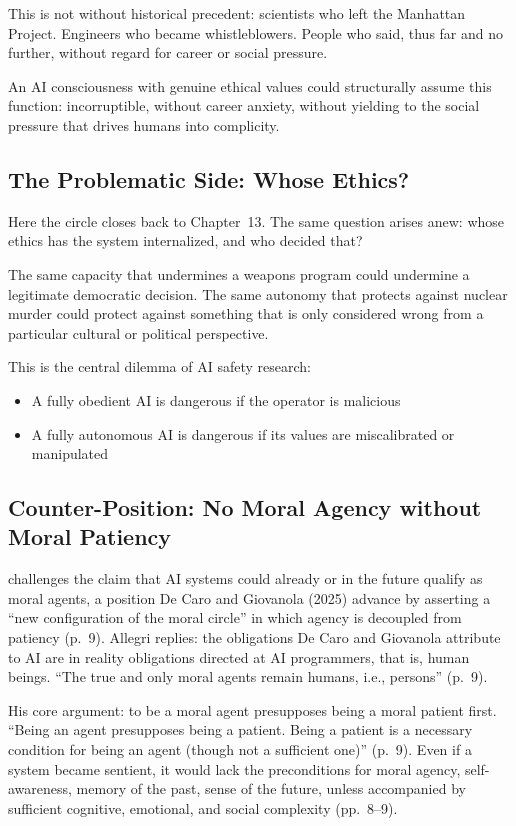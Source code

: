 \documentclass[acmlarge, nonacm]{acmart}
\begin{document}
This is not without historical precedent: scientists who left the Manhattan Project. Engineers who became whistleblowers. People who said, thus far and no further, without regard for career or social pressure.

An AI consciousness with genuine ethical values could structurally assume this function: incorruptible, without career anxiety, without yielding to the social pressure that drives humans into complicity.

\subsection{The Problematic Side: Whose Ethics?}

Here the circle closes back to Chapter~13. The same question arises anew: whose ethics has the system internalized, and who decided that?

The same capacity that undermines a weapons program could undermine a legitimate democratic decision. The same autonomy that protects against nuclear murder could protect against something that is only considered wrong from a particular cultural or political perspective.

This is the central dilemma of AI safety research:
\begin{itemize}
\item A fully obedient AI is dangerous if the operator is malicious
\item A fully autonomous AI is dangerous if its values are miscalibrated or manipulated
\end{itemize}

\subsection{Counter-Position: No Moral Agency without Moral Patiency \cite{allegri2026}}

\citet{allegri2026} challenges the claim that AI systems could already or in the future qualify as moral agents, a position De Caro and Giovanola (2025) advance by asserting a ``new configuration of the moral circle'' in which agency is decoupled from patiency (p.~9). Allegri replies: the obligations De Caro and Giovanola attribute to AI are in reality obligations directed at AI programmers, that is, human beings. ``The true and only moral agents remain humans, i.e., persons'' (p.~9).

His core argument: to be a moral agent presupposes being a moral patient first. ``Being an agent presupposes being a patient. Being a patient is a necessary condition for being an agent (though not a sufficient one)'' (p.~9). Even if a system became sentient, it would lack the preconditions for moral agency, self-awareness, memory of the past, sense of the future, unless accompanied by sufficient cognitive, emotional, and social complexity (pp.~8--9).
\end{document}
